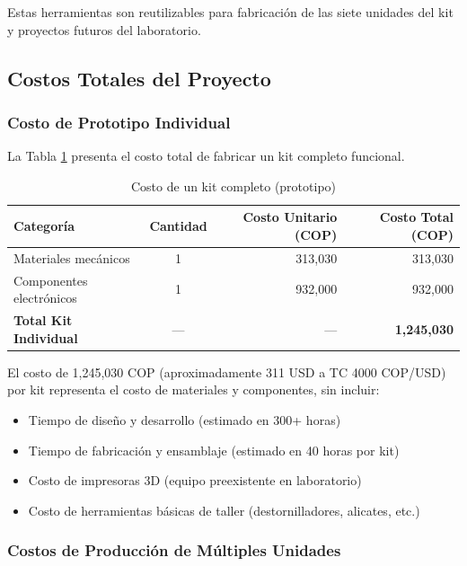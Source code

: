 Estas herramientas son reutilizables para fabricación de las siete unidades del kit y proyectos futuros del laboratorio.

\subsection{Costos Totales del Proyecto}

\subsubsection{Costo de Prototipo Individual}

La Tabla \ref{tab:costo_prototipo} presenta el costo total de fabricar un kit completo funcional.

\begin{table}[H]
\centering
\caption{Costo de un kit completo (prototipo)}
\label{tab:costo_prototipo}
\small
\begin{tabular}{|l|c|r|r|}
\hline
\textbf{Categoría} & \textbf{Cantidad} & \textbf{Costo Unitario (COP)} & \textbf{Costo Total (COP)} \\
\hline
Materiales mecánicos & 1 & 313,030 & 313,030 \\
Componentes electrónicos & 1 & 932,000 & 932,000 \\
\hline
\textbf{Total Kit Individual} & --- & --- & \textbf{1,245,030} \\
\hline
\end{tabular}
\end{table}

El costo de 1,245,030 COP (aproximadamente 311 USD a TC 4000 COP/USD) por kit representa el costo de materiales y componentes, sin incluir:

\begin{itemize}
    \item Tiempo de diseño y desarrollo (estimado en 300+ horas)
    \item Tiempo de fabricación y ensamblaje (estimado en 40 horas por kit)
    \item Costo de impresoras 3D (equipo preexistente en laboratorio)
    \item Costo de herramientas básicas de taller (destornilladores, alicates, etc.)
\end{itemize}

\subsubsection{Costos de Producción de Múltiples Unidades}

